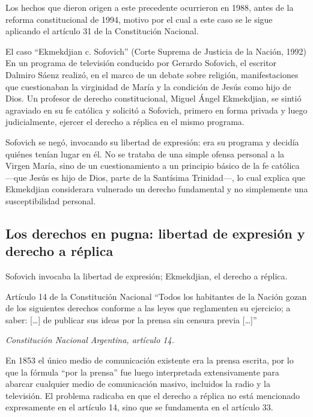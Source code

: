 \documentclass[12pt,oneside]{book}
\begin{document}
Los hechos que dieron origen a este precedente ocurrieron en 1988, antes de la reforma constitucional de 1994, motivo por el cual a este caso se le sigue aplicando el artículo 31 de la Constitución Nacional.

\begin{example}{El caso ``Ekmekdjian c. Sofovich'' (Corte Suprema de Justicia de la Nación, 1992)}
En un programa de televisión conducido por Gerardo Sofovich, el escritor Dalmiro Sáenz realizó, en el marco de un debate sobre religión, manifestaciones que cuestionaban la virginidad de María y la condición de Jesús como hijo de Dios. Un profesor de derecho constitucional, Miguel Ángel Ekmekdjian, se sintió agraviado en su fe católica y solicitó a Sofovich, primero en forma privada y luego judicialmente, ejercer el derecho a réplica en el mismo programa.

Sofovich se negó, invocando su libertad de expresión: era su programa y decidía quiénes tenían lugar en él. No se trataba de una simple ofensa personal a la Virgen María, sino de un cuestionamiento a un principio básico de la fe católica —que Jesús es hijo de Dios, parte de la Santísima Trinidad—, lo cual explica que Ekmekdjian considerara vulnerado un derecho fundamental y no simplemente una susceptibilidad personal.
\end{example}

\subsection{Los derechos en pugna: libertad de expresión y derecho a réplica}

Sofovich invocaba la libertad de expresión; Ekmekdjian, el derecho a réplica.

\begin{definition}{Artículo 14 de la Constitución Nacional}
``Todos los habitantes de la Nación gozan de los siguientes derechos conforme a las leyes que reglamenten su ejercicio; a saber: [\ldots] de publicar sus ideas por la prensa sin censura previa [\ldots]''

\textit{Constitución Nacional Argentina, artículo 14.}
\end{definition}

En 1853 el único medio de comunicación existente era la prensa escrita, por lo que la fórmula ``por la prensa'' fue luego interpretada extensivamente para abarcar cualquier medio de comunicación masivo, incluidos la radio y la televisión. El problema radicaba en que el derecho a réplica no está mencionado expresamente en el artículo 14, sino que se fundamenta en el artículo 33.
\end{document}
